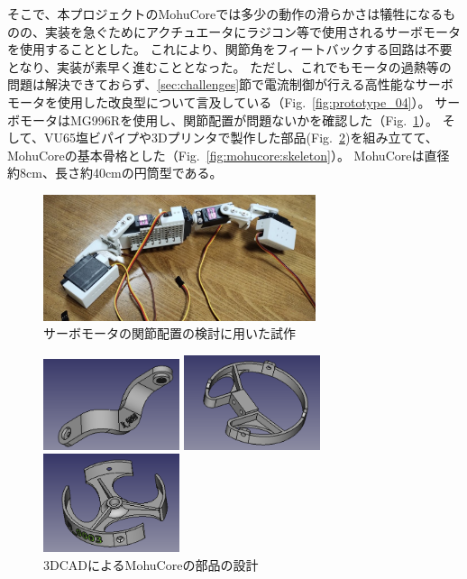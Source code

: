 \documentclass[uplatex,a4paper,12pt]{jsarticle}
\renewcommand{\figurename}{Fig.}
\newcommand{\figref}[1]{\figurename~\ref{#1}}
\begin{document}
そこで、本プロジェクトのMohuCoreでは多少の動作の滑らかさは犠牲になるものの、実装を急ぐためにアクチュエータにラジコン等で使用されるサーボモータを使用することとした。
これにより、関節角をフィートバックする回路は不要となり、実装が素早く進むこととなった。
ただし、これでもモータの過熱等の問題は解決できておらず、\ref{sec:challenges}節で電流制御が行える高性能なサーボモータを使用した改良型について言及している（\figref{fig:prototype_04}）。
サーボモータはMG996Rを使用し、関節配置が問題ないかを確認した（\figref{fig:prototype_02}）。
そして、VU65塩ビパイプや3Dプリンタで製作した部品(\figref{fig:mohucore:cad})を組み立てて、MohuCoreの基本骨格とした（\figref{fig:mohucore:skeleton}）。
MohuCoreは直径約8cm、長さ約40cmの円筒型である。

\begin{figure}[htbp]
  \centering
  \includegraphics[width=8cm]{images/prototype/prototype_02.jpg}
  \caption{サーボモータの関節配置の検討に用いた試作}
  \label{fig:prototype_02}
\end{figure}

\begin{figure}[htbp]
  \centering
  \begin{minipage}[c]{0.32\linewidth}
    \centering
    \includegraphics[keepaspectratio,width=4cm,clip]{images/mohucore/part_k.png}
  \end{minipage}
  \begin{minipage}[c]{0.32\linewidth}
    \centering
    \includegraphics[keepaspectratio,width=4cm,clip]{images/mohucore/part_l.png}
  \end{minipage}
  \begin{minipage}[c]{0.32\linewidth}
    \centering
    \includegraphics[keepaspectratio,width=4cm,clip]{images/mohucore/part_m.png}
  \end{minipage}
  \caption{3DCADによるMohuCoreの部品の設計}
  \label{fig:mohucore:cad}
\end{figure}
\end{document}
